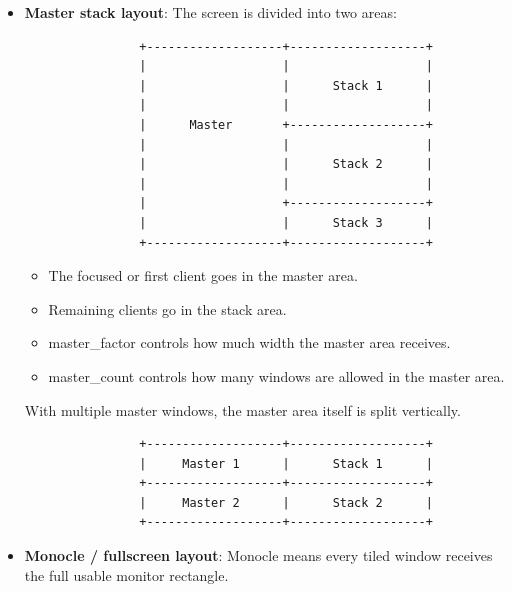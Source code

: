 \documentclass{report}
\begin{document}
\begin{itemize}
\begin{cppcode}
{                    int gap_inner;
                    int gap_outer;
                    int border_width;
                };
            \end{cppcode}
            \bigbreak \noindent 
            The layout algorithm usually processes only tiled clients, floating and fullscreen clients are layered separately.
        \item \textbf{Master stack layout}: The screen is divided into two areas:
            \bigbreak \noindent 
            \begin{verbatim}
                +-------------------+-------------------+
                |                   |                   |
                |                   |      Stack 1      |
                |                   |                   |
                |      Master       +-------------------+
                |                   |                   |
                |                   |      Stack 2      |
                |                   |                   |
                |                   +-------------------+
                |                   |      Stack 3      |
                +-------------------+-------------------+
            \end{verbatim}
            \begin{itemize}
                \item The focused or first client goes in the master area.
                \item Remaining clients go in the stack area.
                \item master\_factor controls how much width the master area receives.
                \item master\_count controls how many windows are allowed in the master area.
            \end{itemize}
            \bigbreak \noindent 
            With multiple master windows, the master area itself is split vertically.
            \bigbreak \noindent 
            \begin{verbatim}
                +-------------------+-------------------+
                |     Master 1      |      Stack 1      |
                +-------------------+-------------------+
                |     Master 2      |      Stack 2      |
                +-------------------+-------------------+
            \end{verbatim}
        \item \textbf{Monocle / fullscreen layout}: Monocle means every tiled window receives the full usable monitor rectangle.

\end{itemize}
\end{document}
